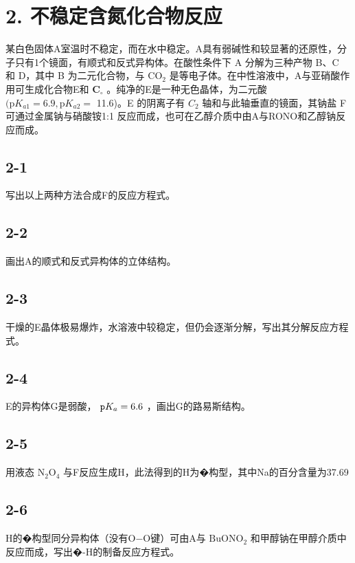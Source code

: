 \section*{2. 不稳定含氮化合物反应}
某⽩⾊固体A室温时不稳定，⽽在⽔中稳定。A具有弱碱性和较显著的还原性，分⼦只有1个镜⾯，有顺式和反式异构体。在酸性条件下 A 分解为三种产物 B、C 和 D，其中 B 为⼆元化合物，与 $\mathrm { C O _ { 2 } }$ 是等电⼦体。在中性溶液中，A与亚硝酸作⽤可⽣成化合物E和 $\mathbf { C } _ { \circ }$ 。纯净的E是⼀种⽆⾊晶体，为⼆元酸 $( \mathrm { p } K _ { a 1 } = 6 . 9 , \mathrm { p } K _ { a 2 } =$ 11.6)。E 的阴离⼦有 $C _ { 2 }$ 轴和与此轴垂直的镜⾯，其钠盐 F 可通过⾦属钠与硝酸铵1:1 反应⽽成，也可在⼄醇介质中由A与RONO和⼄醇钠反应⽽成。

\subsection*{2-1}
写出以上两种⽅法合成F的反应⽅程式。

\subsection*{2-2}
画出A的顺式和反式异构体的⽴体结构。

\subsection*{2-3}
⼲燥的E晶体极易爆炸，⽔溶液中较稳定，但仍会逐渐分解，写出其分解反应⽅程式。

\subsection*{2-4}
E的异构体G是弱酸， ${ \tt p } K _ { a } = 6 . 6$ ，画出G的路易斯结构。

\subsection*{2-5}
⽤液态 $\mathrm { N _ { 2 } O _ { 4 } }$ 与F反应⽣成H，此法得到的H为�构型，其中Na的百分含量为37.69%

\subsection*{2-6}
H的�构型同分异构体（没有O−O键）可由A与 $\mathrm { B u O N O _ { 2 } }$ 和甲醇钠在甲醇介质中反应⽽成，写出�-H的制备反应⽅程式。
